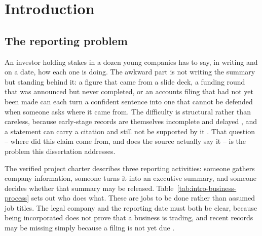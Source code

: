 \chapter{Introduction}
\section{The reporting problem}

An investor holding stakes in a dozen young companies has to say, in writing and on a date, how each
one is doing. The awkward part is not writing the summary but standing behind it: a figure that came
from a slide deck, a funding round that was announced but never completed, or an accounts filing that
had not yet been made can each turn a confident sentence into one that cannot be defended when someone
asks where it came from. The difficulty is structural rather than careless, because early-stage
records are themselves incomplete and delayed \citep{hardman2023small}, and a statement can carry a
citation and still not be supported by it \citep{gao2023alce}. That question -- where did this claim
come from, and does the source actually say it -- is the problem this dissertation addresses.

The verified project charter describes three reporting activities: someone gathers company
information, someone turns it into an executive summary, and someone decides whether that summary
may be released. Table~\ref{tab:intro-business-process} sets out who does what. These are jobs to be
done rather than assumed job titles. The legal company and the reporting date must both be clear,
because being incorporated does not prove that a business is trading, and recent records may be
missing simply because a filing is not yet due \citep{galanakis2026chrt,hardman2023small}.

